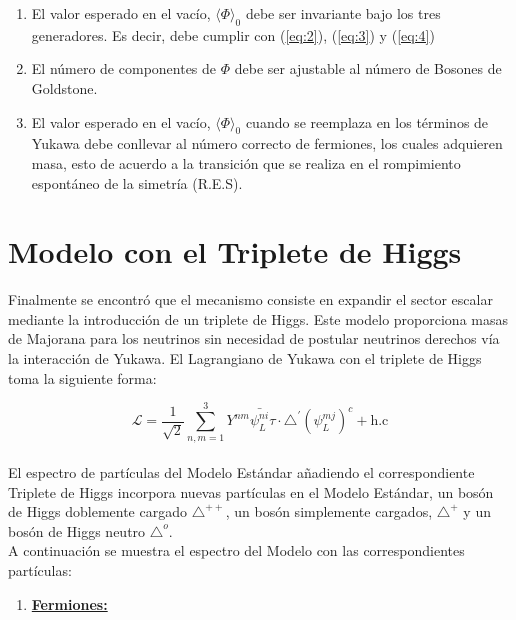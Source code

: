 \documentclass[12pt]{article}
\begin{document}
\begin{enumerate}
\begin{enumerate}
\item El valor esperado en el vacío,  \(\langle \Phi \rangle_0  \) debe ser invariante bajo los tres generadores. Es decir, debe cumplir con  (\ref{eq:2}), (\ref{eq:3}) y (\ref{eq:4})

\item El número de componentes de \(\Phi  \) debe ser ajustable al número de Bosones de Goldstone.

\item El valor esperado en el vacío,  \(\langle \Phi \rangle_0  \)  cuando se reemplaza en los términos de Yukawa debe conllevar al número correcto de fermiones, los cuales adquieren masa, esto de acuerdo a la transición que se realiza en el rompimiento espontáneo de la simetría (R.E.S). 
\end{enumerate}

\section{Modelo con el Triplete de Higgs}

Finalmente se encontró que el mecanismo consiste en expandir el sector escalar mediante la introducción de un triplete de Higgs. Este modelo proporciona masas de Majorana para los neutrinos sin necesidad de postular neutrinos derechos vía la interacción de Yukawa. El Lagrangiano de Yukawa con el triplete de Higgs toma la siguiente forma:

\begin{equation}
    \mathcal{L}= \frac{1}{\sqrt{2}} \sum_{n,m=1}^3 Y^{nm} \bar{\psi_L^{ni}}\tau \cdot \triangle^{'} ({\psi_L^{mj}})^{c} + \text{h.c} 
    \label{eq:7}
\end{equation} \\

El espectro de partículas del Modelo Estándar añadiendo el correspondiente Triplete de Higgs incorpora nuevas partículas en el Modelo Estándar, un bosón de Higgs doblemente cargado \(\triangle^{++} \), un bosón simplemente cargados, \(\triangle^{+} \) y un bosón de Higgs neutro \(\triangle^{o} \). \\

A continuación se muestra el espectro del Modelo con las correspondientes partículas: \\


\begin{enumerate}
\item \underline{ \textbf{Fermiones:}}


\end{enumerate}
\end{enumerate}
\end{document}
